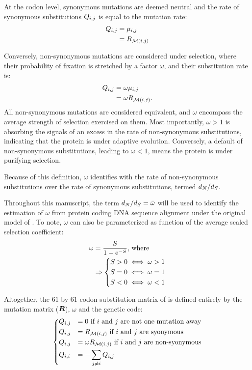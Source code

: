 At the codon level, synonymous mutations are deemed neutral and the rate of synonymous substitutions ${Q_{{i}, {j}}}$ is equal to the mutation rate: 
\begin{align}
Q_{{i}, {j}} & = \mu_{{i}, {j}} \\
				   & = R_{\mathcal{M}({i}, {j})}
\end{align}

Conversely, non-synonymous mutations are considered under selection, where their probability of fixation is stretched by a factor $\omega$, and their substitution rate is:
\begin{align}
Q_{{i}, {j}}  & = \omega \mu_{{i}, {j}} \\
					& = \omega R_{\mathcal{M}({i}, {j})}.
\end{align}
All non-synonymous mutations are considered equivalent, and $\omega$ encompass the average strength of selection exercised on them.
Most importantly, $\omega>1$ is absorbing the signals of an excess in the rate of non-synonymous substitutions, indicating that the protein is under adaptive evolution.
Conversely, a default of non-synonymous substitutions, leading to $\omega<1$, means the protein is under purifying selection.


Because of this definition, $\omega$ identifies with the rate of non-synonymous substitutions over the rate of synonymous substitutions, termed $d_N / d_S$.

Throughout this manuscript, the term $d_N / d_S=\bar{\omega}$ will be used to identify the estimation of $\omega$ from protein coding DNA sequence alignment under the original model of \citet{Muse1994}.
To note, $\omega$ can also be parameterized as function of the average scaled selection coefficient:
\begin{align}
\omega  & = \dfrac{S}{1 - \mathrm{e}^{-S}} \text{, where }\\
& \Rightarrow	\begin{dcases}
	S > 0 \iff \omega > 1 \\
	S = 0 \iff \omega = 1 \\
	S < 0 \iff \omega < 1
	\end{dcases}
\end{align}

Altogether, the $61$-by-$61$ codon substitution matrix of \citet{Muse1994} is defined entirely by the mutation matrix ($\bm{R}$), $\omega$ and the genetic code:
\begin{equation}
\begin{dcases}
Q_{{i}, {j}} & = 0 \text{ if ${i}$ and ${j}$ are not one mutation away} \\
Q_{{i}, {j}} & = R_{\mathcal{M}({i}, {j})} \text{ if ${i}$ and ${j}$ are syonymous} \\
Q_{{i}, {j}} & = \omega R_{\mathcal{M}({i}, {j})} \text{ if ${i}$ and ${j}$ are non-syonymous} \\
Q_{{i}, {i}} & = - \sum_{{j} \neq {i}} Q_{{i}, {j}}
\end{dcases}
\label{eq:codon-models}
\end{equation}

